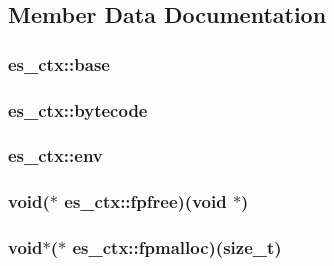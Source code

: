 \subsection{Member Data Documentation}
\hypertarget{structes__ctx_a7c6a94ab6ea5dadd27f4fc84ba847e87}{
\subsubsection[{base}]{ es\-\_\-ctx\-::base}}\label{structes__ctx_a7c6a94ab6ea5dadd27f4fc84ba847e87}
\hypertarget{structes__ctx_a6f40261429125bdbd3dd1ccb1f992483}{
\subsubsection[{bytecode}]{ es\-\_\-ctx\-::bytecode}}\label{structes__ctx_a6f40261429125bdbd3dd1ccb1f992483}
\hypertarget{structes__ctx_afd1fe385c8d9b267c4483864207fceda}{
\subsubsection[{env}]{ es\-\_\-ctx\-::env}}\label{structes__ctx_afd1fe385c8d9b267c4483864207fceda}
\hypertarget{structes__ctx_a927cbaa1ca533daaa238c3a5ebfb5ede}{
\subsubsection[{fpfree}]{\setlength{\rightskip}{0pt plus 5cm}void($\ast$ es\-\_\-ctx\-::fpfree)(void $\ast$)}}\label{structes__ctx_a927cbaa1ca533daaa238c3a5ebfb5ede}
\hypertarget{structes__ctx_ab786126e6ff37f7c6616d81227f4c417}{
\subsubsection[{fpmalloc}]{\setlength{\rightskip}{0pt plus 5cm}void$\ast$($\ast$ es\-\_\-ctx\-::fpmalloc)(size\-\_\-t)}}\label{structes__ctx_ab786126e6ff37f7c6616d81227f4c417}
